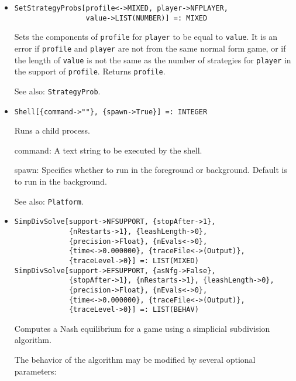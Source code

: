 \begin{itemize}
\item{} 
\protect \large \begin{verbatim}
SetStrategyProbs[profile<->MIXED, player->NFPLAYER, 
                 value->LIST(NUMBER)] =: MIXED 
\end{verbatim} \normalsize

\bd
Sets the components of \verb+profile+ for \verb+player+ to be equal
to \verb+value+.  It is an error if \verb+profile+ and \verb+player+
are not from the same normal form game, or if the length of \verb+value+
is not the same as the number of strategies for \verb+player+ in the
support of \verb+profile+.  Returns \verb+profile+.
\item [See also:] \verb+StrategyProb+.
\ed

\item{}
\protect \large \begin{verbatim}
Shell[{command->""}, {spawn->True}] =: INTEGER 
\end{verbatim} \normalsize

\bd
Runs a child process.  
\bd
\item [command:] A text string to be executed by the shell.  
\item [spawn:] Specifies whether to run in the foreground or
background.  Default is to run in the background.  
\ed
\item [See also:] \verb+Platform+.
\ed

\item{}
\protect \large \begin{verbatim}
SimpDivSolve[support->NFSUPPORT, {stopAfter->1}, 
             {nRestarts->1}, {leashLength->0}, 
             {precision->Float}, {nEvals<->0}, 
             {time<->0.000000}, {traceFile<->(Output)}, 
             {traceLevel->0}] =: LIST(MIXED) 
SimpDivSolve[support->EFSUPPORT, {asNfg->False}, 
             {stopAfter->1}, {nRestarts->1}, {leashLength->0}, 
             {precision->Float}, {nEvals<->0}, 
             {time<->0.000000}, {traceFile<->(Output)}, 
             {traceLevel->0}] =: LIST(BEHAV) 
\end{verbatim}\normalsize

\bd
Computes a Nash equilibrium for a game using a simplicial subdivision
algorithm. 

The behavior of the algorithm may be modified by several optional
parameters:


\end{itemize}
